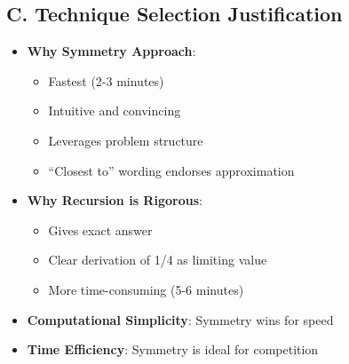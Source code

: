 \documentclass[12pt]{article}
\begin{document}
\begin{techniquesbox}
\subsection*{C. Technique Selection Justification}
\begin{itemize}[leftmargin=*]
    \item \textbf{Why Symmetry Approach}: 
    \begin{itemize}
        \item Fastest (2-3 minutes)
        \item Intuitive and convincing
        \item Leverages problem structure
        \item ``Closest to'' wording endorses approximation
    \end{itemize}
    \item \textbf{Why Recursion is Rigorous}: 
    \begin{itemize}
        \item Gives exact answer
        \item Clear derivation of 1/4 as limiting value
        \item More time-consuming (5-6 minutes)
    \end{itemize}
    \item \textbf{Computational Simplicity}: Symmetry wins for speed
    \item \textbf{Time Efficiency}: Symmetry is ideal for competition
\end{itemize}
\end{techniquesbox}
\end{document}
